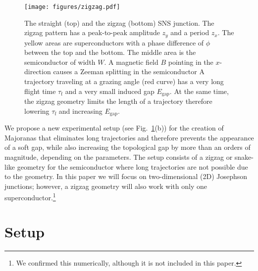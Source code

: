 \documentclass[english, twocolumn, 10pt, aps, superscriptaddress, floatfix, prb, citeautoscript]{revtex4-1}
\renewcommand{\comment}[2]{#2}
\begin{document}
\begin{figure}[!htb]
\centering
\texttt{[image: figures/zigzag.pdf]}
\caption{The straight (top) and the zigzag (bottom) SNS junction.
The zigzag pattern has a peak-to-peak amplitude $z_y$ and a period $z_x$.
The yellow areas are superconductors with a phase difference of $\phi$ between the top and the bottom.
The middle area is the semiconductor of width $W$.
A magnetic field $B$ pointing in the $x$-direction causes a Zeeman splitting in the semiconductor
A trajectory traveling at a grazing angle (red curve) has a very long flight time $\tau_\textrm{f}$ and a very small induced gap $E_\textrm{gap}$.
At the same time, the zigzag geometry limits the length of a trajectory therefore lowering $\tau_\textrm{f}$ and increasing $E_\textrm{gap}$.
\label{fig:setup}}
\end{figure}

\comment{We show that zigzag geometry solves this problem by eliminating the long trajectories.}
We propose a new experimental setup (see Fig.~\ref{fig:setup}(b)) for the creation of Majoranas that eliminates long trajectories and therefore prevents the appearance of a soft gap, while also increasing the topological gap by more than an orders of magnitude, depending on the parameters.
The setup consists of a zigzag or snake-like geometry for the semiconductor where long trajectories are not possible due to the geometry.
In this paper we will focus on two-dimensional (2D) Josephson junctions; however, a zigzag geometry will also work with only one superconductor.\footnote{We confirmed this numerically, although it is not included in this paper.}


\section{Setup}\label{sec:setup}
\end{document}

